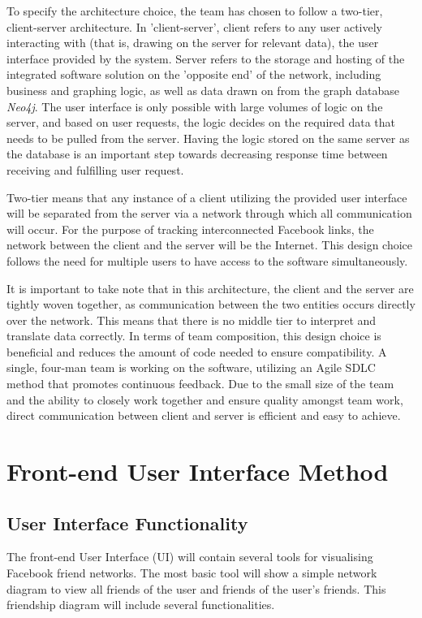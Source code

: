 \documentclass[10pt,onecolumn]{article}
\begin{document}
To specify the architecture choice, the team has chosen to follow a two-tier, client-server architecture. In 'client-server', client refers to any user actively interacting with (that is, drawing on the server for relevant data), the user interface provided by the system. Server refers to the storage and hosting of the integrated software solution on the 'opposite end' of the network, including business and graphing logic, as well as data drawn on from the graph database \emph{Neo4j}. The user interface is only possible with large volumes of logic on the server, and based on user requests, the logic decides on the required data that needs to be pulled from the server. Having the logic stored on the same server as the database is an important step towards decreasing response time between receiving and fulfilling user request.

Two-tier means that any instance of a client utilizing the provided user interface will be separated from the server via a network through which all communication will occur. For the purpose of tracking interconnected Facebook links, the network between the client and the server will be the Internet. This design choice follows the need for multiple users to have access to the software simultaneously. 

It is important to take note that in this architecture, the client and the server are tightly woven together, as communication between the two entities occurs directly over the network. This means that there is no middle tier to interpret and translate data correctly. In terms of team composition, this design choice is beneficial and reduces the amount of code needed to ensure compatibility. A single, four-man team is working on the software, utilizing an Agile SDLC method that promotes continuous feedback. Due to the small size of the team and the ability to closely work together and ensure quality amongst team work, direct communication between client and server is efficient and easy to achieve.



\section{Front-end User Interface Method}

\subsection{User Interface Functionality}
The front-end User Interface (UI) will contain several tools for visualising Facebook friend networks. The most basic tool will show a simple network diagram to view all friends of the user and friends of the user's friends. This friendship diagram will include several functionalities.
\end{document}
